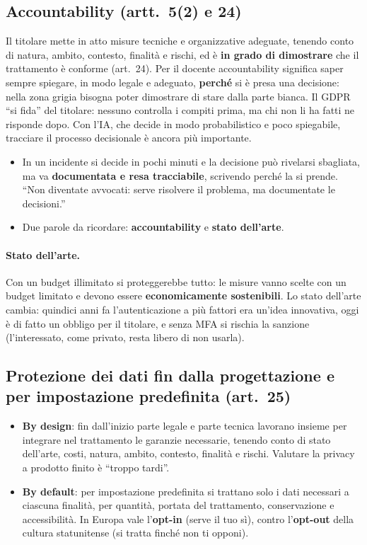 \subsection{Accountability (artt.~5(2) e 24)}
Il titolare mette in atto misure tecniche e organizzative adeguate, tenendo conto di natura, ambito,
contesto, finalità e rischi, ed è \textbf{in grado di dimostrare} che il trattamento è conforme
(art.~24). Per il docente accountability significa saper sempre spiegare, in modo legale e adeguato,
\textbf{perché} si è presa una decisione: nella zona grigia bisogna poter dimostrare di stare dalla parte
bianca. Il GDPR ``si fida'' del titolare: nessuno controlla i compiti prima, ma chi non li ha fatti ne
risponde dopo. Con l'IA, che decide in modo probabilistico e poco spiegabile, tracciare il processo
decisionale è ancora più importante.

\begin{esame}
\begin{itemize}
  \item In un incidente si decide in pochi minuti e la decisione può rivelarsi sbagliata, ma va
    \textbf{documentata e resa tracciabile}, scrivendo perché la si prende. ``Non diventate avvocati:
    serve risolvere il problema, ma documentate le decisioni.''
  \item Due parole da ricordare: \textbf{accountability} e \textbf{stato dell'arte}.
\end{itemize}
\end{esame}

\paragraph{Stato dell'arte.} Con un budget illimitato si proteggerebbe tutto: le misure vanno scelte con
un budget limitato e devono essere \textbf{economicamente sostenibili}. Lo stato dell'arte cambia:
quindici anni fa l'autenticazione a più fattori era un'idea innovativa, oggi è di fatto un obbligo per il
titolare, e senza MFA si rischia la sanzione (l'interessato, come privato, resta libero di non usarla).

\subsection{Protezione dei dati fin dalla progettazione e per impostazione predefinita (art.~25)}
\begin{itemize}
  \item \textbf{By design}: fin dall'inizio parte legale e parte tecnica lavorano insieme per integrare
    nel trattamento le garanzie necessarie, tenendo conto di stato dell'arte, costi, natura, ambito,
    contesto, finalità e rischi. Valutare la privacy a prodotto finito è ``troppo tardi''.
  \item \textbf{By default}: per impostazione predefinita si trattano solo i dati necessari a ciascuna
    finalità, per quantità, portata del trattamento, conservazione e accessibilità. In Europa vale
    l'\textbf{opt-in} (serve il tuo sì), contro l'\textbf{opt-out} della cultura statunitense (si tratta
    finché non ti opponi).
\end{itemize}

